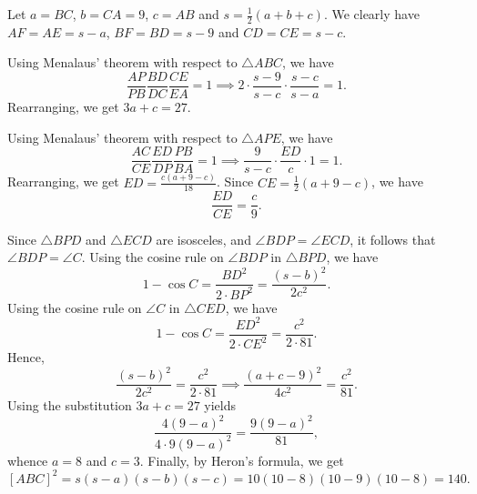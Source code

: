 \begin{solution*}   
    Let $a = BC$, $b = CA = 9$, $c = AB$ and $s = \frac12 (a + b + c)$. We clearly have $AF = AE = s-a$, $BF = BD = s-9$ and $CD = CE = s-c$.
    
    Using Menalaus' theorem with respect to $\triangle ABC$, we have \[\frac{AP}{PB} \frac{BD}{DC} \frac{CE}{EA} = 1 \implies 2 \cdot \frac{s-9}{s-c} \cdot \frac{s-c}{s-a} = 1.\] Rearranging, we get $3a + c = 27$.
    
    Using Menalaus' theorem with respect to $\triangle APE$, we have \[\frac{AC}{CE} \frac{ED}{DP} \frac{PB}{BA} = 1 \implies \frac{9}{s-c}\cdot \frac{ED}{c} \cdot 1 = 1.\] Rearranging, we get $ED = \frac{c(a + 9 - c)}{18}$. Since $CE = \frac12 (a + 9 - c)$, we have \[\frac{ED}{CE} = \frac{c}{9}.\]
    
    Since $\triangle BPD$ and $\triangle ECD$ are isosceles, and $\angle BDP = \angle ECD$, it follows that $\angle BDP = \angle C$. Using the cosine rule on $\angle BDP$ in $\triangle BPD$, we have \[1 - \cos C = \frac{BD^2}{2 \cdot BP^2} = \frac{(s-b)^2}{2c^2}.\] Using the cosine rule on $\angle C$ in $\triangle CED$, we have \[1 - \cos C = \frac{ED^2}{2 \cdot CE^2} = \frac{c^2}{2 \cdot 81}.\] Hence, \[\frac{(s-b)^2}{2c^2} = \frac{c^2}{2 \cdot 81} \implies \frac{(a + c - 9)^2}{4c^2} = \frac{c^2}{81}.\] Using the substitution $3a + c = 27$ yields \[\frac{4(9-a)^2}{4 \cdot 9(9-a)^2} = \frac{9(9-a)^2}{81},\] whence $a = 8$ and $c = 3$. Finally, by Heron's formula, we get \[[ABC]^2 = s(s-a)(s-b)(s-c) = 10(10-8)(10-9)(10-8) = 140.\]
\end{solution*}

